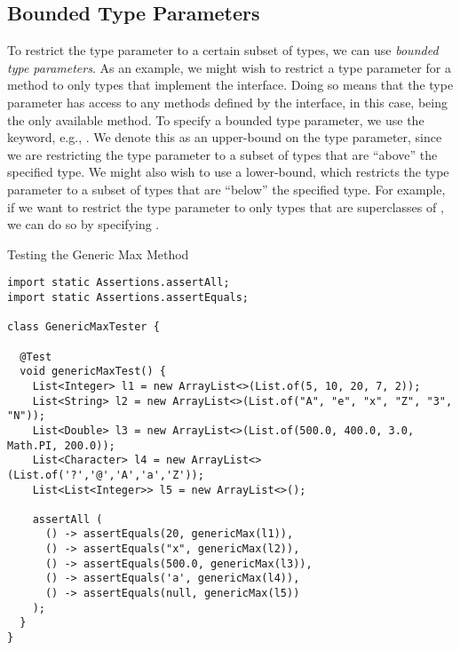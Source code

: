 \subsection*{Bounded Type Parameters}
To restrict the type parameter to a certain subset of types, we can use \textit{bounded type parameters}. As an example, we might wish to restrict a type parameter for a method to only types that implement the  interface. Doing so means that the type parameter has access to any methods defined by the interface, in this case,  being the only available method. To specify a bounded type parameter, we use the  keyword, e.g., . We denote this as an upper-bound on the type parameter, since we are restricting the type parameter to a subset of types that are ``above'' the specified type. We might also wish to use a lower-bound, which restricts the type parameter to a subset of types that are ``below'' the specified type. For example, if we want to restrict the type parameter to only types that are superclasses of , we can do so by specifying .


\begin{cl}{Testing the Generic Max Method}
\begin{lstlisting}[language=MyJava]
import static Assertions.assertAll;
import static Assertions.assertEquals;

class GenericMaxTester {
  
  @Test 
  void genericMaxTest() {
    List<Integer> l1 = new ArrayList<>(List.of(5, 10, 20, 7, 2));
    List<String> l2 = new ArrayList<>(List.of("A", "e", "x", "Z", "3", "N"));
    List<Double> l3 = new ArrayList<>(List.of(500.0, 400.0, 3.0, Math.PI, 200.0));
    List<Character> l4 = new ArrayList<>(List.of('?','@','A','a','Z'));
    List<List<Integer>> l5 = new ArrayList<>();

    assertAll (
      () -> assertEquals(20, genericMax(l1)),
      () -> assertEquals("x", genericMax(l2)),
      () -> assertEquals(500.0, genericMax(l3)),
      () -> assertEquals('a', genericMax(l4)),
      () -> assertEquals(null, genericMax(l5))
    );
  }
}
\end{lstlisting}
\end{cl}

